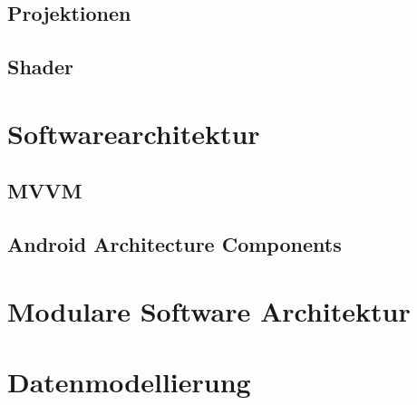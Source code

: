 \subsection{Projektionen}
\subsection{Shader}

\section{Softwarearchitektur}
\subsection{MVVM}
\subsection{Android Architecture Components}

\section{Modulare Software Architektur}
\section{Datenmodellierung}
